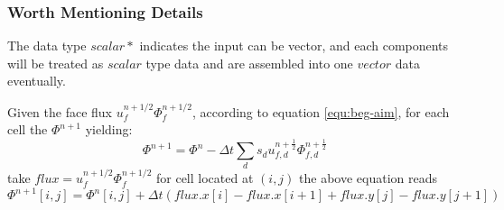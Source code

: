 \subsubsection{Worth Mentioning Details}\label{sec:bcg-direction}
The data type $scalar*$ indicates the input can be vector, and each components will be treated as $scalar$ type data and are assembled into one $vector$ data eventually.\par
Given the face flux $u^{n+1/2}_f \Phi^{n+1/2}_f$, according to equation \ref{equ:beg-aim}, for each cell the $\Phi^{n+1}$ yielding:
\begin{equation}
    \Phi^{n+1} = \Phi^n-\Delta t \sum_{d} s_d u_{f,d}^{n+ \frac{1}{2}}\Phi_{f,d}^{n + \frac{1}{2}}
\end{equation}
take $flux = u^{n+1/2}_f \Phi^{n+1/2}_f$ for cell located at $(i,j)$ the above equation reads
\begin{equation}
    \Phi^{n+1}[i,j] = \Phi^n[i,j] + \Delta t (flux.x[i] - flux.x[i+1] + flux.y[j] - flux.y[j+1])
\end{equation}

